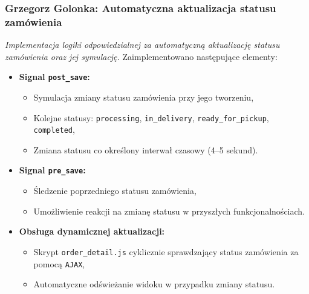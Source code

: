 \documentclass[12pt,a4paper,oneside]{article}
\theoremstyle{definition}
\numberwithin{equation}{section}
\begin{document}
\subsubsection{Grzegorz Golonka: Automatyczna aktualizacja statusu zamówienia}
\label{section:1.3.29}
\textit{
Implementacja logiki odpowiedzialnej za automatyczną aktualizację statusu zamówienia oraz jej symulację.
}
Zaimplementowano następujące elementy:
\begin{itemize}
    \item \textbf{Signal \texttt{post\_save}:}
    \begin{itemize}
        \item Symulacja zmiany statusu zamówienia przy jego tworzeniu,
        \item Kolejne statusy: \texttt{processing}, \texttt{in\_delivery}, \texttt{ready\_for\_pickup}, \texttt{completed},
        \item Zmiana statusu co określony interwał czasowy (4–5 sekund).
    \end{itemize}
    \item \textbf{Signal \texttt{pre\_save}:}
    \begin{itemize}
        \item Śledzenie poprzedniego statusu zamówienia,
        \item Umożliwienie reakcji na zmianę statusu w przyszłych funkcjonalnościach.
    \end{itemize}
    \item \textbf{Obsługa dynamicznej aktualizacji:}
    \begin{itemize}
        \item Skrypt \texttt{order\_detail.js} cyklicznie sprawdzający status zamówienia za pomocą \texttt{AJAX},
        \item Automatyczne odświeżanie widoku w przypadku zmiany statusu.
    \end{itemize}
\end{itemize}
%
%
\end{document}

